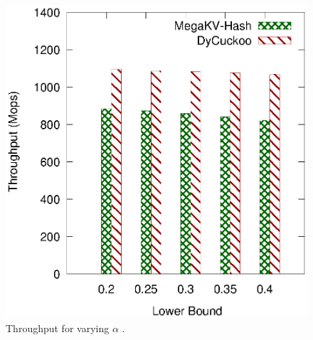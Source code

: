 \begin{figure}[htp]
\begin{minipage}{0.19\linewidth}
		\centerline{\dsali}
	\end{minipage}
	\begin{minipage}{0.19\linewidth}\centering
		\includegraphics[width=\linewidth]{pic/dynamic/lower/dynamic_random.eps}
		\centerline{\dsrandom}
	\end{minipage}
	\caption{Throughput for varying $\alpha$ .}
	\label{fig:vary-lower-time}
\end{figure}

